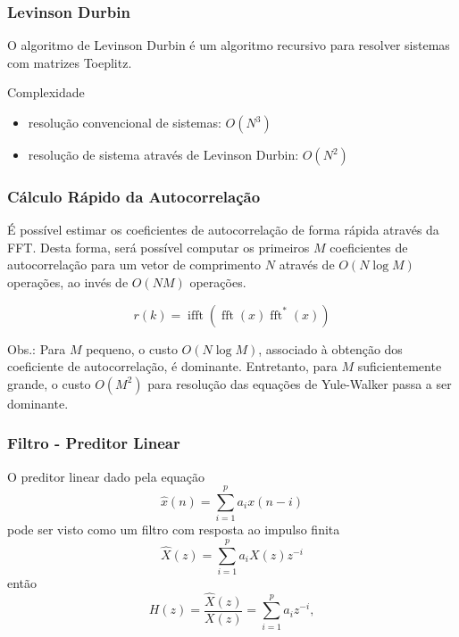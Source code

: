 \begin{frame}
  \frametitle{Levinson Durbin}
  O algoritmo de Levinson Durbin é um algoritmo recursivo para resolver sistemas com matrizes Toeplitz.

  \vspace{1cm}
  Complexidade
  \begin{itemize}
  \item resolução convencional de sistemas: $O(N^3)$
  \item resolução de sistema através de Levinson Durbin: $O(N^2)$
  \end{itemize}
\end{frame}

\begin{frame}
  \frametitle{Cálculo Rápido da Autocorrelação}
  É possível estimar os coeficientes de autocorrelação de forma rápida através da FFT.
  Desta forma, será possível computar os primeiros $M$ coeficientes de autocorrelação
  para um vetor de comprimento $N$ através de $O(N\log M)$ operações, ao invés de $O(NM)$ operações.

  \begin{equation}
  r(k) = \operatorname{ifft}(\operatorname{fft}(x) \operatorname{fft}^\ast(x))
  \end{equation}

  Obs.: Para $M$ pequeno, o custo $O(N\log M)$, associado à obtenção dos coeficiente de autocorrelação, é dominante.
  Entretanto, para $M$ suficientemente grande, o custo $O(M^2)$ para resolução das equações de Yule-Walker passa
  a ser dominante.
\end{frame}

\begin{frame}
  \frametitle{Filtro - Preditor Linear}

  O preditor linear dado pela equação
  \begin{equation}
  \hat{x}(n) = \sum_{i=1}^{p} a_i x(n-i)
  \end{equation}
  pode ser visto como um filtro com resposta ao impulso finita
  \begin{equation}
  \hat{X}(z) = \sum_{i=1}^{p} a_i X(z) z^{-i}
  \end{equation}
  então
  \begin{equation}
  H(z) = \frac{\hat{X}(z)}{X(z)} = \sum_{i=1}^{p} a_i z^{-i} ,
  \end{equation}
\end{frame}

